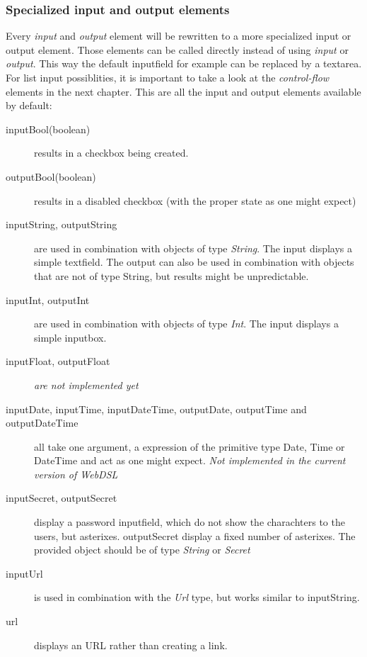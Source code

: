 \subsubsection{Specialized input and output elements}
Every \emph{input} and \emph{output} element will be rewritten to a more specialized input or output element. Those elements can be called directly instead of using \emph{input} or \emph{output}. This way the default inputfield for example can be replaced by a textarea. For list input possiblities, it is important to take a look at the \emph{control-flow} elements in the next chapter. This are all the input and output elements available by default:
\begin{description}
	\item[inputBool(boolean)] results in a checkbox being created. 
	\item[outputBool(boolean)] results in a disabled checkbox (with the proper state as one might expect)
	\item[inputString, outputString] are used in combination with objects of type \emph{String}. The input displays a simple textfield. The output can also be used in combination with objects that are not of type String, but results might be unpredictable. 
	\item[inputInt, outputInt] are used in combination with objects of type \emph{Int}. The input displays a simple inputbox. 
	\item[inputFloat, outputFloat] \emph{are not implemented yet}
	\item[inputDate, inputTime, inputDateTime, outputDate, outputTime and outputDateTime] all take one argument, a expression of the primitive type Date, Time or DateTime and act as one might expect. \emph{Not implemented in the current version of WebDSL}
	\item[inputSecret, outputSecret] display a password inputfield, which do not show the charachters to the users, but asterixes. outputSecret display a fixed number of asterixes. The provided object should be of type \emph{String} or \emph{Secret}
	\item[inputUrl] is used in combination with the \emph{Url} type, but works similar to inputString.
	\item[url] displays an URL rather than creating a link. %
	

\end{description}
